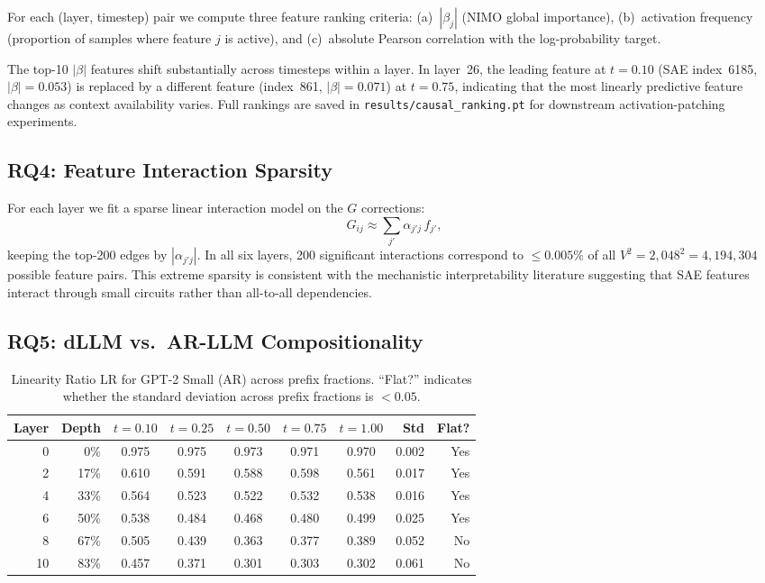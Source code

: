 \documentclass[11pt]{article}
\newcommand{\LR}{\mathrm{LR}}
\begin{document}
For each (layer, timestep) pair we compute three feature ranking criteria: (a)~$|\beta_j|$ (NIMO global importance), (b)~activation frequency (proportion of samples where feature $j$ is active), and (c)~absolute Pearson correlation with the log-probability target.

The top-10 $|\beta|$ features shift substantially across timesteps within a layer. In layer~26, the leading feature at $t = 0.10$ (SAE index~6185, $|\beta| = 0.053$) is replaced by a different feature (index~861, $|\beta| = 0.071$) at $t = 0.75$, indicating that the most linearly predictive feature changes as context availability varies. Full rankings are saved in \texttt{results/causal\_ranking.pt} for downstream activation-patching experiments.

\subsection{RQ4: Feature Interaction Sparsity}

For each layer we fit a sparse linear interaction model on the $G$ corrections:
\begin{equation}
    G_{ij} \approx \sum_{j'} \alpha_{j'j}\,f_{j'},
\end{equation}
keeping the top-200 edges by $|\alpha_{j'j}|$.
In all six layers, 200 significant interactions correspond to $\le 0.005\%$ of all $V^2 = 2{,}048^2 = 4{,}194{,}304$ possible feature pairs.
This extreme sparsity is consistent with the mechanistic interpretability literature suggesting that SAE features interact through small circuits rather than all-to-all dependencies.

\subsection{RQ5: dLLM vs.\ AR-LLM Compositionality}

\begin{table}[h]
\centering
\caption{Linearity Ratio $\LR$ for GPT-2 Small (AR) across prefix fractions. ``Flat?'' indicates whether the standard deviation across prefix fractions is $< 0.05$.}
\label{tab:lr_ar}
\begin{tabular}{rr ccccc rr}
\toprule
\textbf{Layer} & \textbf{Depth} & $t=0.10$ & $t=0.25$ & $t=0.50$ & $t=0.75$ & $t=1.00$ & \textbf{Std} & \textbf{Flat?} \\
\midrule
0  & 0\%   & 0.975 & 0.975 & 0.973 & 0.971 & 0.970 & 0.002 & Yes \\
2  & 17\%  & 0.610 & 0.591 & 0.588 & 0.598 & 0.561 & 0.017 & Yes \\
4  & 33\%  & 0.564 & 0.523 & 0.522 & 0.532 & 0.538 & 0.016 & Yes \\
6  & 50\%  & 0.538 & 0.484 & 0.468 & 0.480 & 0.499 & 0.025 & Yes \\
8  & 67\%  & 0.505 & 0.439 & 0.363 & 0.377 & 0.389 & 0.052 & No  \\
10 & 83\%  & 0.457 & 0.371 & 0.301 & 0.303 & 0.302 & 0.061 & No  \\
\bottomrule
\end{tabular}
\end{table}
\end{document}
